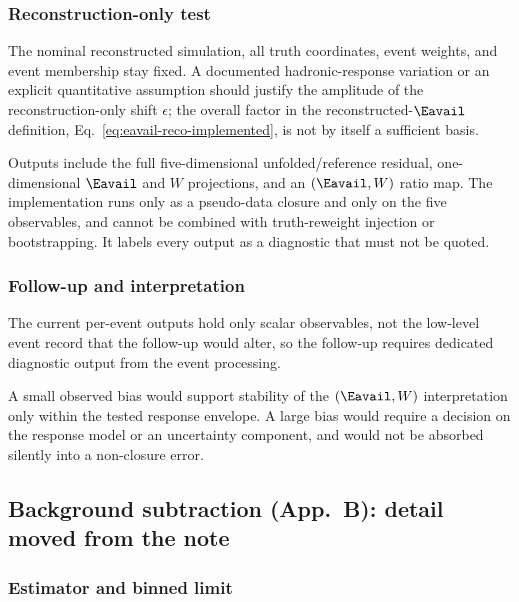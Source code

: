 \subsubsection{Reconstruction-only test}

The nominal reconstructed simulation, all truth coordinates, event weights, and event membership stay fixed. A documented hadronic-response variation or an explicit quantitative assumption should justify the amplitude of the reconstruction-only shift $\epsilon$; the overall factor in the reconstructed-$\Eavail$ definition, Eq.~\eqref{eq:eavail-reco-implemented}, is not by itself a sufficient basis.

Outputs include the full five-dimensional unfolded/reference residual, one-dimensional $\Eavail$ and $W$ projections, and an $(\Eavail,W)$ ratio map. The implementation runs only as a pseudo-data closure and only on the five observables, and cannot be combined with truth-reweight injection or bootstrapping. It labels every output as a diagnostic that must not be quoted.

\subsubsection{Follow-up and interpretation}

The current per-event outputs hold only scalar observables, not the low-level event record that the follow-up would alter, so the follow-up requires dedicated diagnostic output from the event processing.

A small observed bias would support stability of the $(\Eavail,W)$ interpretation only within the tested response envelope. A large bias would require a decision on the response model or an uncertainty component, and would not be absorbed silently into a non-closure error.

\subsection{Background subtraction (App.~B): detail moved from the note}

\subsubsection{Estimator and binned limit}

